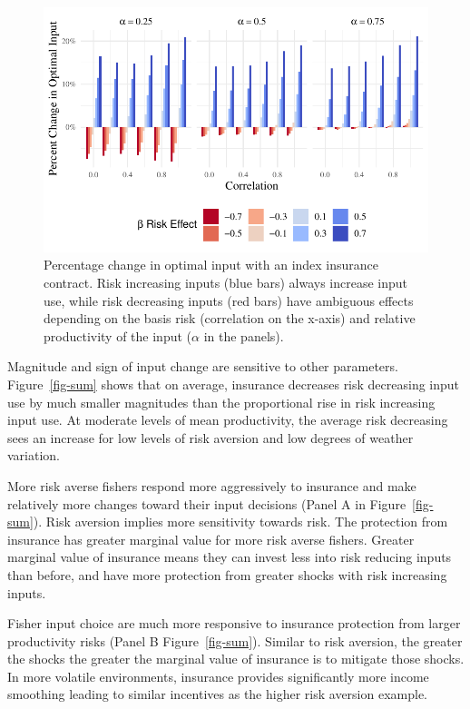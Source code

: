 \documentclass[
  letterpaper,
  DIV=11,
  numbers=noendperiod]{scrartcl}
\theoremstyle{plain}
\theoremstyle{plain}
\theoremstyle{remark}
\begin{document}
\begin{figure}

{\centering \includegraphics{ibi-behavior_files/figure-pdf/fig-corr-1.pdf}

}

\caption{\label{fig-corr}Percentage change in optimal input with an
index insurance contract. Risk increasing inputs (blue bars) always
increase input use, while risk decreasing inputs (red bars) have
ambiguous effects depending on the basis risk (correlation on the
x-axis) and relative productivity of the input (\(\alpha\) in the
panels).}

\end{figure}

Magnitude and sign of input change are sensitive to other parameters.
Figure~\ref{fig-sum} shows that on average, insurance decreases risk
decreasing input use by much smaller magnitudes than the proportional
rise in risk increasing input use. At moderate levels of mean
productivity, the average risk decreasing sees an increase for low
levels of risk aversion and low degrees of weather variation.

More risk averse fishers respond more aggressively to insurance and make
relatively more changes toward their input decisions (Panel A in
Figure~\ref{fig-sum}). Risk aversion implies more sensitivity towards
risk. The protection from insurance has greater marginal value for more
risk averse fishers. Greater marginal value of insurance means they can
invest less into risk reducing inputs than before, and have more
protection from greater shocks with risk increasing inputs.

Fisher input choice are much more responsive to insurance protection
from larger productivity risks (Panel B Figure~\ref{fig-sum}). Similar
to risk aversion, the greater the shocks the greater the marginal value
of insurance is to mitigate those shocks. In more volatile environments,
insurance provides significantly more income smoothing leading to
similar incentives as the higher risk aversion example.
\end{document}
